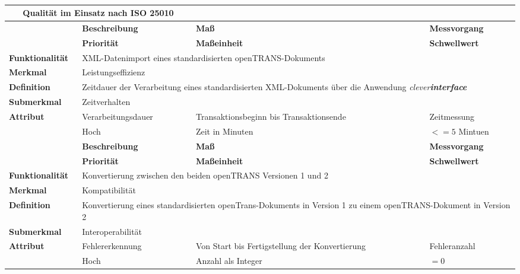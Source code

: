\egroup
\ \newline
\newpage
\bgroup
\def\arraystretch{1.5}%
\begin{tabularx}{\textwidth}{ p{70pt} | X | X | X }
	\multicolumn{2}{c}{\textbf{Qualität im Einsatz nach ISO 25010}} \\ \hline
	& \textbf{Beschreibung} & \textbf{Maß} & \textbf{Messvorgang} \\ \hline
	& \textbf{Priorität} & \textbf{Maßeinheit} & \textbf{Schwellwert} \\ \hline
	\textbf{Funktionalität} & \multicolumn{3}{p{300pt}}{XML-Datenimport eines standardisierten openTRANS-Dokuments} \\ \hline
	\textbf{Merkmal} & \multicolumn{3}{X}{Leistungseffizienz} \\ \hline
	\textbf{Definition} & \multicolumn{3}{p{380pt}}{Zeitdauer der Verarbeitung eines standardisierten XML-Dokuments über die Anwendung \emph{clever\textbf{interface}}} \\ \hline
	\textbf{Submerkmal} & \multicolumn{3}{X}{Zeitverhalten} \\ \hline 
	\textbf{Attribut} & Verarbeitungsdauer & Transaktionsbeginn bis Transaktionsende & Zeitmessung  \\ \hline
	& Hoch               & Zeit in Minuten & $<= 5$ Mintuen  \\ 
	\hline 
	\hline 
	& \textbf{Beschreibung} & \textbf{Maß} & \textbf{Messvorgang} \\ \hline
	& \textbf{Priorität} & \textbf{Maßeinheit} & \textbf{Schwellwert} \\ \hline
	\textbf{Funktionalität} & \multicolumn{3}{p{300pt}}{Konvertierung zwischen den beiden openTRANS Versionen 1 und 2} \\ \hline
	\textbf{Merkmal} & \multicolumn{3}{X}{Kompatibilität} \\ \hline
	\textbf{Definition} & \multicolumn{3}{p{380pt}}{Konvertierung eines standardisierten openTrans-Dokuments in Version 1 zu einem openTRANS-Dokument in Version 2} \\ \hline
	\textbf{Submerkmal} & \multicolumn{3}{X}{Interoperabilität} \\ \hline 
	\textbf{Attribut} & Fehlererkennung & Von Start bis Fertigstellung der Konvertierung  & Fehleranzahl  \\ \hline
	& Hoch               & Anzahl als Integer & $= 0$  \\ \hline
\end{tabularx}
\egroup
